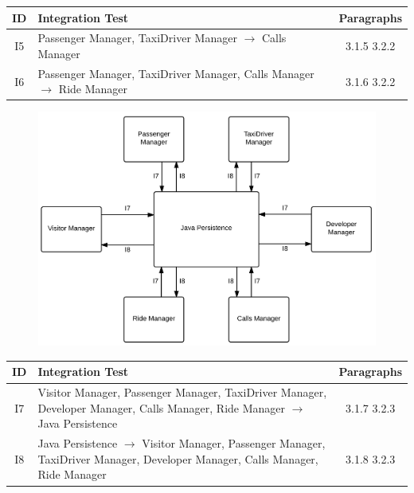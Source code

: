 \begin{table}[!htbp]
\begin{center}
\begin{tabular}[t]{c|p{}|c}

\textbf{ID} & \textbf{Integration Test} & \textbf{Paragraphs} \\
\hline
I5 & Passenger Manager, TaxiDriver Manager $\rightarrow$ Calls Manager & 3.1.5  3.2.2\\
\hline
I6 & Passenger Manager, TaxiDriver Manager, Calls Manager $\rightarrow$ Ride Manager & 3.1.6  3.2.2\\
\hline
\end{tabular}
\end{center}
\end{table}
\clearpage

\begin{figure}[!htbp]
\centering
\includegraphics[width=\textwidth]{cpt/img/ITDPComponentDiagramsTP3}
\end{figure}

\begin{table}[!htbp]
\begin{center}
\begin{tabular}[t]{c|p{}|c}

\textbf{ID} & \textbf{Integration Test} & \textbf{Paragraphs} \\
\hline
I7 & Visitor Manager, Passenger Manager, TaxiDriver Manager, Developer Manager, Calls Manager, Ride Manager $\rightarrow$ Java Persistence & 3.1.7  3.2.3 \\
\hline
I8 & Java Persistence $\rightarrow$ Visitor Manager, Passenger Manager, TaxiDriver Manager, Developer Manager, Calls Manager, Ride Manager & 3.1.8  3.2.3 \\
\hline
\end{tabular}
\end{center}
\end{table}
\clearpage

